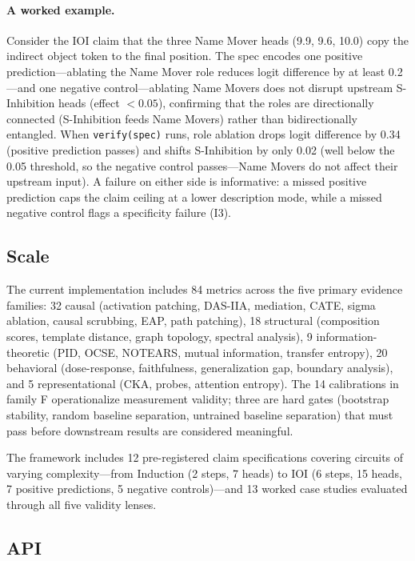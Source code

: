\documentclass[10pt]{article}
\begin{document}
\paragraph{A worked example.} Consider the IOI claim that the three Name Mover heads (9.9, 9.6, 10.0) copy the indirect object token to the final position. The spec encodes one positive prediction---ablating the Name Mover role reduces logit difference by at least 0.2---and one negative control---ablating Name Movers does not disrupt upstream S-Inhibition heads (effect $< 0.05$), confirming that the roles are directionally connected (S-Inhibition feeds Name Movers) rather than bidirectionally entangled. When \texttt{verify(spec)} runs, role ablation drops logit difference by 0.34 (positive prediction passes) and shifts S-Inhibition by only 0.02 (well below the 0.05 threshold, so the negative control passes---Name Movers do not affect their upstream input). A failure on either side is informative: a missed positive prediction caps the claim ceiling at a lower description mode, while a missed negative control flags a specificity failure (I3).

\subsection{Scale}
\label{sec:scale}

The current implementation includes 84 metrics across the five primary evidence families: 32 causal (activation patching, DAS-IIA, mediation, CATE, sigma ablation, causal scrubbing, EAP, path patching), 18 structural (composition scores, template distance, graph topology, spectral analysis), 9 information-theoretic (PID, OCSE, NOTEARS, mutual information, transfer entropy), 20 behavioral (dose-response, faithfulness, generalization gap, boundary analysis), and 5 representational (CKA, probes, attention entropy). The 14 calibrations in family F operationalize measurement validity; three are hard gates (bootstrap stability, random baseline separation, untrained baseline separation) that must pass before downstream results are considered meaningful.

The framework includes 12 pre-registered claim specifications covering circuits of varying complexity---from Induction (2 steps, 7 heads) to IOI (6 steps, 15 heads, 7 positive predictions, 5 negative controls)---and 13 worked case studies evaluated through all five validity lenses.

\subsection{API}
\label{sec:api}
\end{document}
